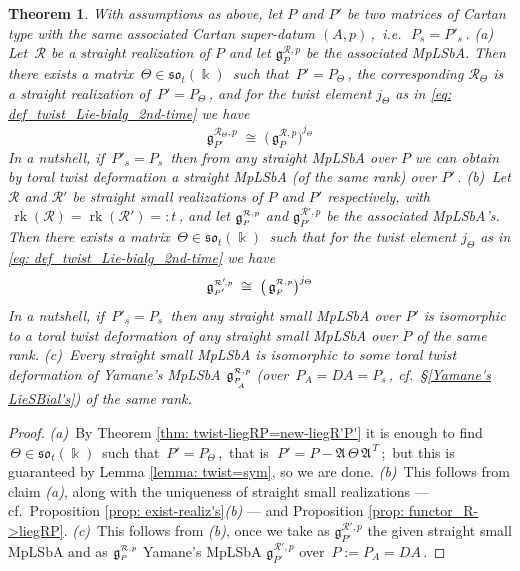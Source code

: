 \documentclass[12pt,reqno,twoside,a4paper]{amsart}
\numberwithin{equation}{section}
\newtheorem{theorem}[lema]{Theorem}
\theoremstyle{definition}
\newtheorem{free text}[lema]{}
\theoremstyle{remark}
\newcommand \rk{\operatorname{rk}}
\newcommand{\R}{{\mathcal R}}
\def \Ppicc {{\scriptscriptstyle P}}
\def \Thetapicc {{\scriptscriptstyle \Theta}}
\def \lieg{\mathfrak{g}}
\def \liegRpP{\mathfrak{g}^{\raise1pt\hbox{$ \scriptscriptstyle \mathcal{R},p $}}_\Ppicc}
\def \liegRpPa{\mathfrak{g}^{\raise1pt\hbox{$ \scriptscriptstyle \mathcal{R},p $}}_{\Ppicc_{\raise-3pt\hbox{$ \scriptscriptstyle \!\! A $}}}}
\def \lieso{\mathfrak{so}}
\def \pf{\begin{proof}}
\def \epf{\end{proof}}
\theoremstyle{plain}
\begin{document}
\begin{theorem}  \label{thm: MpLSbA=twist-Yamane's}
%
 With assumptions as above, let  $ P $  and  $ P' $  be two matrices of Cartan type with the
 same associated Cartan super-datum $ (A,p) \, $,  \,i.e.\  $ \, P_s = P'_s \, $.
%
 \vskip3pt
%
   (a)\,  Let  $ \, \R $  be a  \textsl{straight}  realization of  $ P $  and let
   $ \lieg_\Ppicc^{\scriptscriptstyle \R,p} $
   be the associated MpLSbA.  Then there exists a matrix  $ \, \Theta \in \lieso_t(\Bbbk) \, $
   such that  $ \, P' = P_\Thetapicc \, $,  the corresponding $ \R_\Thetapicc $
   is a  \textsl{straight}  realization of  $ \, P' = P_\Thetapicc \, $,
   and for the twist element
   $ j_\Thetapicc $  as in  \eqref{eq: def_twist_Lie-bialg_2nd-time}  we have
  $$
  \lieg_{\scriptscriptstyle P'}^{\scriptscriptstyle \R_\Thetapicc,p}  \; \cong \;
  {\big(\, \lieg_\Ppicc^{\scriptscriptstyle \R,p} \big)}^{j_\Theta}
  $$
%
   \indent   In a nutshell, if  $ \, P'_s = P_s \, $  then from any straight MpLSbA over  $ P $
   we can obtain by toral twist deformation a straight MpLSbA (of the same rank) over  $ P' \, $.
%
 \vskip3pt
%
   (b)\,  Let  $ \R $  and  $ \R' $  be  \textsl{straight small}  realizations of
   $ P $  and  $ P' $
respectively, with  $ \, \rk(\R) = \rk(\R') =: t \, $,  and let  $ \liegRpP $  and
$ \lieg_{\scriptscriptstyle P'}^{\scriptscriptstyle \R'\!,p} $  be the associated MpLSbA's.
Then there exists a matrix  $ \, \Theta \in \lieso_t(\Bbbk) \, $
such that for the twist element
$ j_\Thetapicc $  as in  \eqref{eq: def_twist_Lie-bialg_2nd-time}  we have
%
  $$
  \lieg_{\scriptscriptstyle P'}^{\scriptscriptstyle \R'\!,p}  \; \cong \;
  {\big(\, \liegRpP \big)}^{j_\Theta}
  $$
%
   \indent   In a nutshell, if  $ \, P'_s = P_s \, $  then any straight small MpLSbA over
   $ P' $  is isomorphic to a toral twist deformation of any straight small MpLSbA over  $ P $  of the same rank.
%
 \vskip3pt
%
   (c)\,  Every straight small MpLSbA is isomorphic to some toral twist deformation of
   Yamane's MpLSbA  $ \liegRpPa $
   (over  $ \, P_{\scriptscriptstyle A} = DA = P_s \, $,  cf.\  \S \ref{Yamane's LieSBial's})
   of the same rank.
%
\end{theorem}

\pf
%
 \textit{(a)}\,  By  Theorem \ref{thm: twist-liegRP=new-liegR'P'}  it is enough to find
 $ \, \Theta \in \lieso_t(\Bbbk)  \, $  such that  $ \, P' = P_\Thetapicc \, $,  \,that is
 $ \; P' = P - \mathfrak{A} \, \Theta \, \mathfrak{A}^{\,\scriptscriptstyle T} \, $;
 \,but this is guaranteed by  Lemma \ref{lemma: twist=sym},  so we are done.
%
 \vskip3pt
%
   \textit{(b)}\,  This follows from claim  \textit{(a)},  along with the uniqueness of straight small realizations   --- cf.\ Proposition \ref{prop: exist-realiz's}\textit{(b)}  ---   and  Proposition \ref{prop: functor_R->liegRP}.
%
 \vskip3pt
%
   \textit{(c)}\,  This follows from  \textit{(b)},  once we take as
   $ \lieg_{\scriptscriptstyle P'}^{\scriptscriptstyle \R'\!,p} $
   the given straight small MpLSbA and as  $ \liegRpP $  Yamane's MpLSbA  $ \lieg_{\scriptscriptstyle P'}^{\scriptscriptstyle \R'\!,p} $  over
   $ \, P := P_{\scriptscriptstyle A} = DA \, $.
%
\epf
\end{document}
